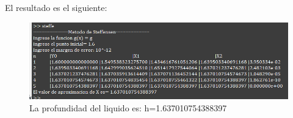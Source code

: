 \documentclass{article}
\theoremstyle{mytheoremstyle}
\theoremstyle{mytheoremstyle}
\theoremstyle{myproblemstyle}
\begin{document}
El resultado es el siguiente:
\begin{figure}[ht]
    \includegraphics[scale=0.7]{img/stf7.png}{\\La profundidad del liquido es: h=1.637010754388397}
\end{figure}
\end{document}
